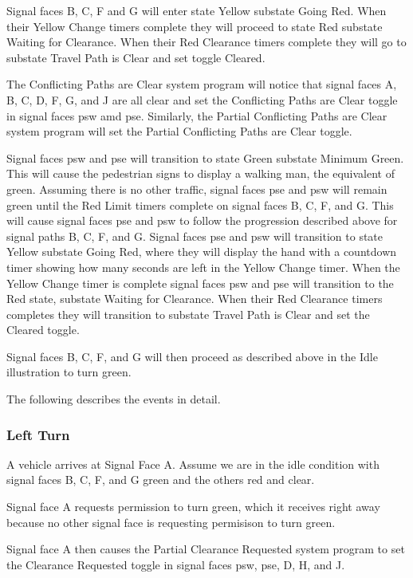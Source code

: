 \documentclass[letterpaper,twoside]{article}
\begin{document}
Signal faces B, C, F and G will enter state Yellow substate Going Red.
When their Yellow Change timers complete they will proceed to state Red
substate Waiting for Clearance.
When their Red Clearance timers complete they will go
to substate Travel Path is Clear and set toggle Cleared.

The Conflicting Paths are Clear system program will notice that
signal faces A, B, C, D, F, G, and J are all clear and set the
Conflicting Paths are Clear toggle in signal faces psw amd pse.  Similarly,
the Partial Conflicting Paths are Clear system program will set the
Partial Conflicting Paths are Clear toggle.

Signal faces psw and pse will transition to state Green substate Minimum Green.
This will cause the pedestrian signs to display a walking man, the equivalent
of green.  Assuming there is no other traffic, signal faces pse and psw
will remain green
until the Red Limit timers complete on signal faces B, C, F, and G.
This will cause signal faces pse and psw to follow the progression described
above
for signal paths B, C, F, and G.  Signal faces pse and psw will transition
to state Yellow
substate Going Red, where they will display the hand with a countdown timer
showing how many seconds are left in the Yellow Change timer.  When the Yellow
Change timer is complete signal faces psw and pse will transition to the
Red state,
substate Waiting for Clearance.  When their Red Clearance timers completes
they will
transition to substate Travel Path is Clear and set the Cleared toggle.

Signal faces B, C, F, and G will then proceed as described above
in the Idle illustration to turn green.

The following describes the events in detail.



\subsubsection{Left Turn}

A vehicle arrives at Signal Face A.  Assume we are in the idle condition
with signal faces B, C, F, and G green and the others red and clear.

Signal face A requests permission to turn green, which it receives right
away because no other signal face is requesting permisison to turn green.

Signal face A then causes the Partial Clearance Requested system program
to set the Clearance Requested toggle in signal faces psw, pse, D, H, and J.
\end{document}
